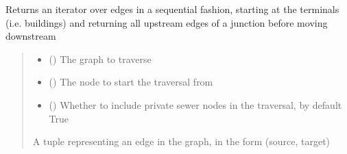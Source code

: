 \documentclass[letterpaper,10pt,english]{sphinxmanual}
\begin{document}
\begin{fulllineitems}
\label{\detokenize{pysewer:pysewer.optimization.reverse_bfs}}
\pysigstartsignatures
{}
\pysigstopsignatures
\sphinxAtStartPar
Returns an iterator over edges in a sequential fashion, starting at the terminals (i.e. buildings) and returning all upstream edges of a junction before moving downstream
\begin{quote}\begin{description}
\begin{itemize}
\item {} 
\sphinxAtStartPar
{} () \textendash{} The graph to traverse

\item {} 
\sphinxAtStartPar
{} () \textendash{} The node to start the traversal from

\item {} 
\sphinxAtStartPar
{} (\sphinxstyleliteralemphasis{\sphinxupquote{, }}) \textendash{} Whether to include private sewer nodes in the traversal, by default True

\end{itemize}

\sphinxAtStartPar
{} \textendash{} A tuple representing an edge in the graph, in the form (source, target)

\end{description}\end{quote}

\end{fulllineitems}

\end{document}
